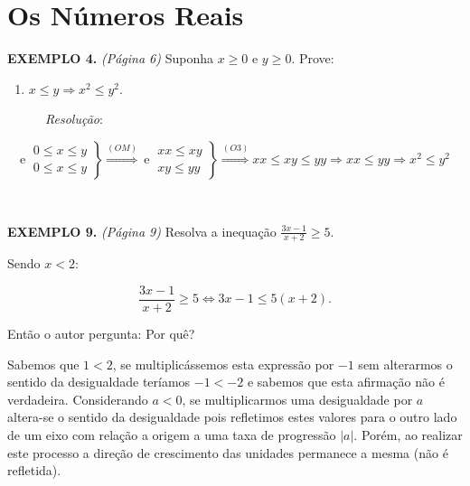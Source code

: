 \documentclass[]{book}
\providecommand{\tightlist}{%
  \setlength{\itemsep}{0pt}\setlength{\parskip}{0pt}}
\begin{document}
\section{Os Números Reais}\label{os-numeros-reais}

\textbf{EXEMPLO 4.} \emph{(Página 6)} Suponha \(x \geqslant 0\) e
\(y \geqslant 0\). Prove:

\begin{enumerate}
\def\labelenumi{\alph{enumi})}
\setcounter{enumi}{1}
\tightlist
\item
  \(x \leqslant y \Rightarrow x^{2} \leqslant y^{2}\).
\end{enumerate}

~~~~~~\emph{Resolução}:

\[\textrm{e} \ \left.\begin{matrix} 0 \leqslant x \leqslant y\\ 0 \leqslant x \leqslant y \end{matrix}\right\} \overset{(OM)}{\Rightarrow} \ \textrm{e} \ \left.\begin{matrix} xx \leqslant xy \\ xy \leqslant yy \end{matrix}\right\} \overset{(O3)}{\Rightarrow} xx \leqslant xy \leqslant yy \Rightarrow xx \leqslant yy \Rightarrow x^{2} \leqslant y^{2}\]

~

\textbf{EXEMPLO 9.} \emph{(Página 9)} Resolva a inequação
\(\frac{3x-1}{x+2} \geqslant 5\).

Sendo \(x < 2\):

\[\frac{3x-1}{x+2} \geqslant 5 \Leftrightarrow 3x-1 \leqslant 5(x+2).\]

Então o autor pergunta: Por quê?

Sabemos que \(1 < 2\), se multiplicássemos esta expressão por \(-1\) sem
alterarmos o sentido da desigualdade teríamos \(-1 < -2\) e sabemos que
esta afirmação não é verdadeira. Considerando \(a < 0\), se
multiplicarmos uma desigualdade por \(a\) altera-se o sentido da
desigualdade pois refletimos estes valores para o outro lado de um eixo
com relação a origem a uma taxa de progressão \(\left | a \right |\).
Porém, ao realizar este processo a direção de crescimento das unidades
permanece a mesma (não é refletida).

~
\end{document}

